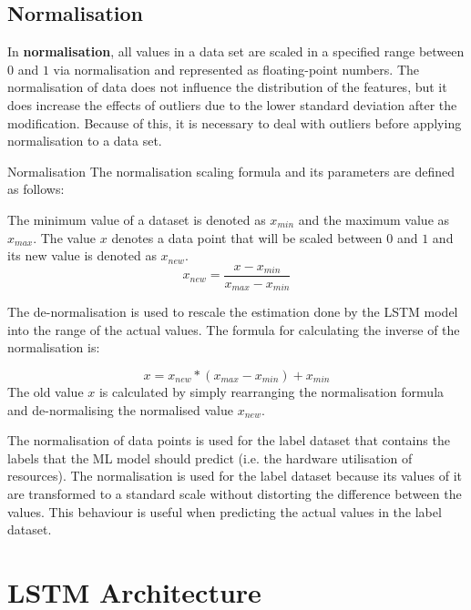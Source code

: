   \subsection{Normalisation}
  \label{sec:data-normalisation-data-preprocessing-architecture}

    In \textbf{normalisation}, all values in a data set are scaled in a specified range between $0$ and $1$ via normalisation and represented as floating-point numbers.
    The normalisation of data does not influence the distribution of the features, but it does increase the effects of outliers due to the lower standard deviation after the modification. Because of this, it is necessary to deal with outliers before applying normalisation to a data set.
    
    \begin{pabox}{Normalisation}
      \label{def:normalisation}
      The normalisation scaling formula and its parameters are defined as follows:

      The minimum value of a dataset is denoted as $x_{min}$ and the maximum value as $x_{max}$.
      The value $x$ denotes a data point that will be scaled between $0$ and $1$ and its new value is denoted as $x_{new}$.
      $$x_{new} = \frac{x - x_{min}}{x_{max} - x_{min}}$$

      The de-normalisation is used to rescale the estimation done by the LSTM model into the range of the actual values. The formula for calculating the inverse of the normalisation is:

      $$x = x_{new} * (x_{max} - x_{min}) + x_{min}$$
      The old value $x$ is calculated by simply rearranging the normalisation formula and de-normalising the normalised value $x_{new}$.
    \end{pabox}
    The normalisation of data points is used for the label dataset that contains the labels that the ML model should predict (i.e. the hardware utilisation of resources). The normalisation is used for the label dataset because its values of it are transformed to a standard scale without distorting the difference between the values. This behaviour is useful when predicting the actual values in the label dataset.

  
\section{LSTM Architecture}
\label{sec:lstm-architecture-and-implementation}

